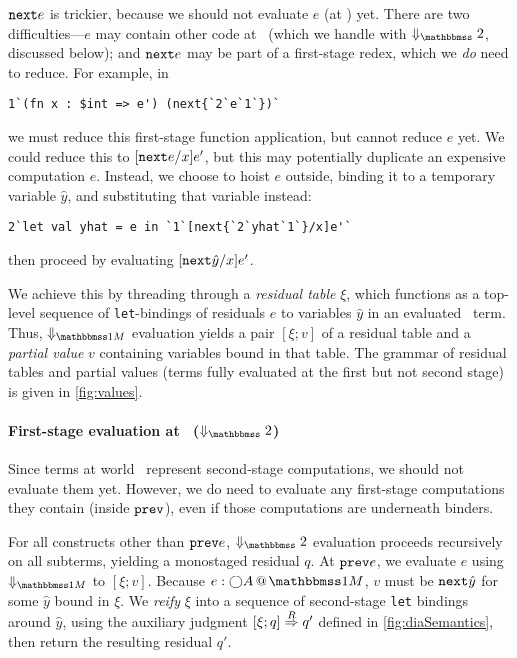 \begin{abstrsyn}
${\tt next}{e}$ is trickier, because we should not evaluate $e$ (at \bbtwo) yet.
There are two difficulties---$e$ may contain other code at \bbonem\ (which we
handle with $\redtwosym$, discussed below); and ${\tt next}{e}$ may be part of a
first-stage redex, which we \emph{do} need to reduce. For example, in
\begin{lstlisting} 
1`(fn x : $int => e') (next{`2`e`1`})`
\end{lstlisting}
we must reduce this first-stage function application, but cannot reduce $e$ yet.
We could reduce this to $[{\tt next}{e}/x]e'$, but this may potentially duplicate an
expensive computation $e$. Instead, we choose to hoist $e$ outside, binding it
to a temporary variable $\hat{y}$, and substituting that variable instead:
\begin{lstlisting} 
2`let val yhat = e in `1`[next{`2`yhat`1`}/x]e'`
\end{lstlisting}
then proceed by evaluating $[{\tt next}{\hat{y}}/x]e'$.

We achieve this by threading through a \emph{residual table} $\xi$, which
functions as a top-level sequence of \texttt{let}-bindings of residuals $e$ to
variables $\hat{y}$ in an evaluated \bbonem\ term. Thus, $\redonesym$ evaluation
yields a pair $[\xi;v]$ of a residual table and a \emph{partial value} $v$
containing variables bound in that table. The grammar of residual tables and
partial values (terms fully evaluated at the first but not second stage) is
given in \ref{fig:values}.


\paragraph{First-stage evaluation at \bbtwo\ ($\redtwosym$)}
Since terms at world \bbtwo\ represent second-stage computations, we should not
evaluate them yet. However, we do need to evaluate any first-stage computations
they contain (inside ${\tt prev}$), even if those computations are underneath
binders.

For all constructs other than ${\tt prev}{e}$, $\redtwosym$ evaluation proceeds
recursively on all subterms, yielding a monostaged residual $q$. At ${\tt prev}{e}$,
we evaluate $e$ using $\redonesym$ to $[\xi;v]$. Because $\colmix e{\fut A}$,
$v$ must be ${\tt next}{\hat{y}}$ for some $\hat{y}$ bound in $\xi$. We \emph{reify}
$\xi$ into a sequence of second-stage \texttt{let} bindings around $\hat{y}$,
using the auxiliary judgment $[{\xi};{q}]\overset{R}\Rightarrow{q'}$ defined in
\ref{fig:diaSemantics}, then return the resulting residual $q'$.

\end{abstrsyn}

